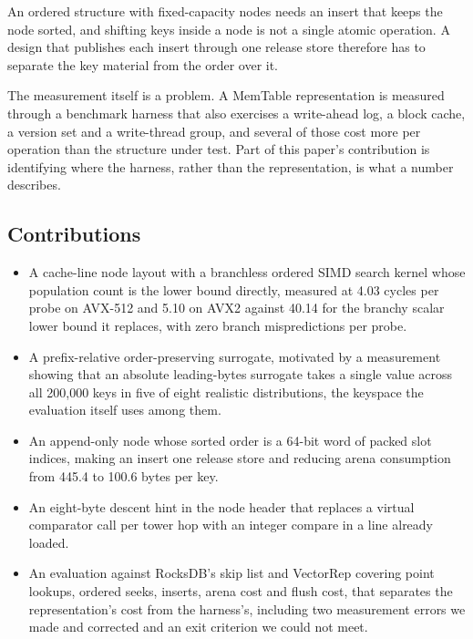 \documentclass[conference]{IEEEtran}
\begin{document}
An ordered structure with fixed-capacity nodes needs an insert that keeps the node
sorted, and shifting keys inside a node is not a single atomic operation. A design
that publishes each insert through one release store therefore has to separate the
key material from the order over it.

The measurement itself is a problem. A MemTable representation is measured through
a benchmark harness that also exercises a write-ahead log, a block cache, a
version set and a write-thread group, and several of those cost more per operation
than the structure under test. Part of this paper's contribution is identifying
where the harness, rather than the representation, is what a number describes.

\subsection{Contributions}

\begin{itemize}
\item A cache-line node layout with a branchless ordered SIMD search kernel whose
      population count is the lower bound directly, measured at 4.03 cycles per
      probe on AVX-512 and 5.10 on AVX2 against 40.14 for the branchy scalar lower
      bound it replaces, with zero branch mispredictions per probe.
\item A prefix-relative order-preserving surrogate, motivated by a measurement
      showing that an absolute leading-bytes surrogate takes a single value across
      all 200{,}000 keys in five of eight realistic distributions, the keyspace
      the evaluation itself uses among them.
\item An append-only node whose sorted order is a 64-bit word of packed slot
      indices, making an insert one release store and reducing arena consumption
      from 445.4 to 100.6 bytes per key.
\item An eight-byte descent hint in the node header that replaces a virtual
      comparator call per tower hop with an integer compare in a line already
      loaded.
\item An evaluation against RocksDB's skip list and VectorRep covering point
      lookups, ordered seeks, inserts, arena cost and flush cost, that separates
      the representation's cost from the harness's, including two measurement
      errors we made and corrected and an exit criterion we could not meet.
\end{itemize}
\end{document}
